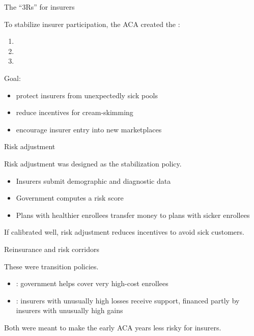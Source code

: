 \begin{frame}{The ``3Rs'' for insurers}

    To stabilize insurer participation, the ACA created the :
    \begin{enumerate}
        \item {}
        \item {}
        \item {}
    \end{enumerate}

    \vspace{3mm}

    Goal:
    \begin{itemize}
        \item protect insurers from unexpectedly sick pools
        \item reduce incentives for cream-skimming
        \item encourage insurer entry into new marketplaces
    \end{itemize}

\end{frame}
\begin{frame}{Risk adjustment}

    Risk adjustment was designed as the  stabilization policy.

    \begin{itemize}
        \item Insurers submit demographic and diagnostic data
        \item Government computes a risk score
        \item Plans with healthier enrollees transfer money to plans with sicker enrollees
    \end{itemize}

    \vspace{3mm}

    If calibrated well, risk adjustment reduces incentives to avoid sick customers.

\end{frame}
\begin{frame}{Reinsurance and risk corridors}

    These were  transition policies.

    \begin{itemize}
        \item {}: government helps cover very high-cost enrollees
        \item {}: insurers with unusually high losses receive support, financed partly by insurers with unusually high gains
    \end{itemize}

    \vspace{3mm}

    Both were meant to make the early ACA years less risky for insurers.

\end{frame}

